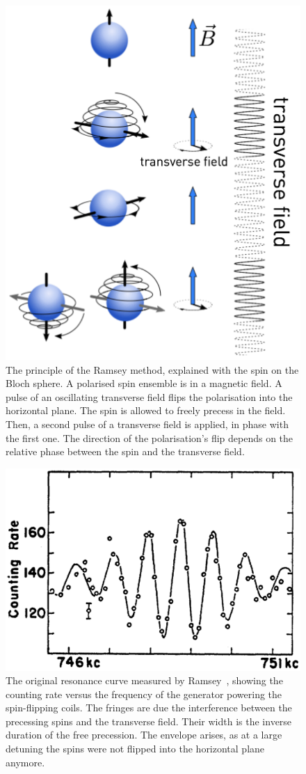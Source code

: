 \begin{figure}
  \centering
  \includegraphics[width=.6\linewidth]{gfx/nEDMatPSI/Ramsey_principle.png}
  \caption{The principle of the Ramsey method, explained with the spin on the Bloch sphere. A polarised spin ensemble is in a magnetic field. A pulse of an oscillating transverse field flips the polarisation into the horizontal plane. The spin is allowed to freely precess in the field. Then, a second pulse of a transverse field is applied, in phase with the first one. The direction of the polarisation's flip depends on the relative phase between the spin and the transverse field.}\label{fig:nEDM_Ramsey_principle}
\end{figure}

\begin{figure}
  \centering
  \includegraphics[width=.6\linewidth]{gfx/introduction/Ramsey_original_resonance.png}
  \caption{The original resonance curve measured by Ramsey~\cite{PhysRev.108.120}, showing the counting rate versus the frequency of the generator powering the spin-flipping coils. The fringes are due the interference between the precessing spins and the transverse field. Their width is the inverse duration of the free precession. The envelope arises, as at a large detuning the spins were not flipped into the horizontal plane anymore.}\label{fig:nEDM_Ramsey_original_curve}
\end{figure}

